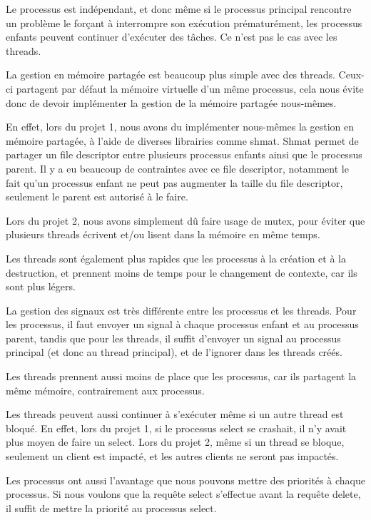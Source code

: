 \documentclass[utf8]{article}
\begin{document}
\begin{large}
Le processus est indépendant, et donc même si le processus principal rencontre
un problème le forçant à interrompre son exécution prématurément, les processus
enfants peuvent continuer d'exécuter des tâches. Ce n'est pas le cas avec les
threads.

La gestion en mémoire partagée est beaucoup plus simple avec des threads.
Ceux-ci partagent par défaut la mémoire virtuelle d'un même processus, cela nous
évite donc de devoir implémenter la gestion de la mémoire partagée nous-mêmes.
\par
En effet, lors du projet 1, nous avons du implémenter nous-mêmes la gestion en
mémoire partagée, à l'aide de diverses librairies comme shmat. Shmat permet de
partager un file descriptor entre plusieurs processus enfants ainsi que le
processus parent. Il y a eu beaucoup de contraintes avec ce file descriptor,
notamment le fait qu'un processus enfant ne peut pas augmenter la taille du file
descriptor, seulement le parent est autorisé à le faire. 
\par
Lors du projet 2, nous
avons simplement dû faire usage de mutex, pour éviter que plusieurs threads écrivent
et/ou lisent dans la mémoire en même temps.
\par
Les threads sont également plus rapides que les processus à la création et à la
destruction, et prennent moins de temps pour le changement de contexte, car ils
sont plus légers.
\par La gestion des signaux est très différente entre les
processus et les threads. Pour les processus, il faut envoyer un signal à chaque
processus enfant et au processus parent, tandis que pour les threads, il suffit
d'envoyer un signal au processus principal (et donc au thread principal), et de
l'ignorer dans les threads créés.
\par
Les threads prennent aussi moins de place que les processus, car ils partagent
la même mémoire, contrairement aux processus.
\par
Les threads peuvent aussi continuer à s'exécuter même si un autre thread est
bloqué. En effet, lors du projet 1, si le processus select se crashait, il n'y
avait plus moyen de faire un select. Lors du projet 2, même si un thread se bloque,
seulement un client est impacté, et les autres clients ne seront pas impactés.
\par 
Les processus ont aussi l'avantage que nous pouvons mettre des priorités à
chaque processus. Si nous voulons que la requête select s'effectue avant la
requête delete, il suffit de mettre la priorité au processus select. 




\end{large}
\end{document}
